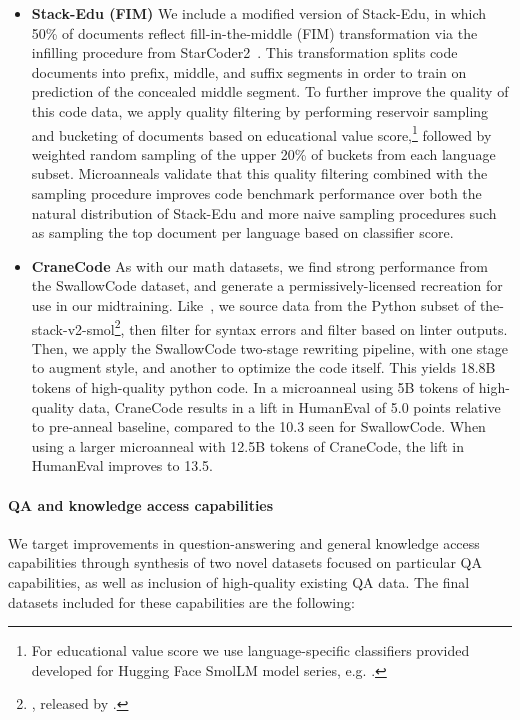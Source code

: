 \documentclass[table]{ai2style/ai2}
\begin{document}
\begin{itemize}
\item{\bf Stack-Edu (FIM)} We include a modified version of Stack-Edu, in which 50\% of documents reflect fill-in-the-middle (FIM) transformation via the infilling procedure from StarCoder2~\citep{lozhkov2024starcoder}. This transformation splits code documents into prefix, middle, and suffix segments in order to train on prediction of the concealed middle segment. To further improve the quality of this code data, we apply quality filtering by performing reservoir sampling and bucketing of documents based on educational value score,\footnote{For educational value score we use language-specific classifiers provided developed for Hugging Face SmolLM model series, e.g. \href{https://huggingface.co/HuggingFaceTB/stack-edu-classifier-php}{}.} followed by weighted random sampling of the upper 20\% of buckets from each language subset. Microanneals validate that this quality filtering combined with the sampling procedure improves code benchmark performance over both the natural distribution of Stack-Edu and more naive sampling procedures such as sampling the top document per language based on classifier score.

\item {\bf CraneCode} As with our math datasets, we find strong performance from the SwallowCode dataset, and generate a permissively-licensed recreation for use in our midtraining. 
Like~\citet{fujii2025rewriting}, we source data from the Python subset of the-stack-v2-smol\footnote{\href{https://huggingface.co/datasets/bigcode/the-stack-v2-train-smol-ids}{}, released by \citet{lozhkov2024starcoder}.}, 
then filter for syntax errors and filter based on linter outputs.
Then, we apply the SwallowCode two-stage rewriting pipeline, with one stage to augment style, and another to optimize the code itself. 
This yields 18.8B tokens of high-quality python code. 
In a microanneal using 5B tokens of high-quality data, CraneCode results in a lift in HumanEval of 5.0 points relative to pre-anneal baseline, compared to the 10.3 seen for SwallowCode. 
When using a larger microanneal with 12.5B tokens of CraneCode, the lift in HumanEval improves to 13.5.

\end{itemize}

\paragraph{QA and knowledge access capabilities}
We target improvements in question-answering and general knowledge access capabilities through synthesis of two novel datasets focused on particular QA capabilities, as well as inclusion of high-quality existing QA data. The final datasets included for these capabilities are the following:
\end{document}
